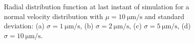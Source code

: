 \documentclass[../../master_thesis_np.tex]{subfiles}
\begin{document}
		
		\begin{figure}[htp]
			\centering\
			\\
			\\
			
			\caption{Radial distribution function at last instant of simulation for a normal velocity distribution with $\mu = \SI{10}{\um\per\second}$ and standard deviation: (a) $\sigma = \SI{1}{\um\per\second}$, (b) $\sigma = \SI{2}{\um\per\second}$, (c) $\sigma = \SI{5}{\um\per\second}$, (d) $\sigma = \SI{10}{\um\per\second}$.}
			\label{fig:lj_vdist_rdf}
		\end{figure}
		
\end{document}
